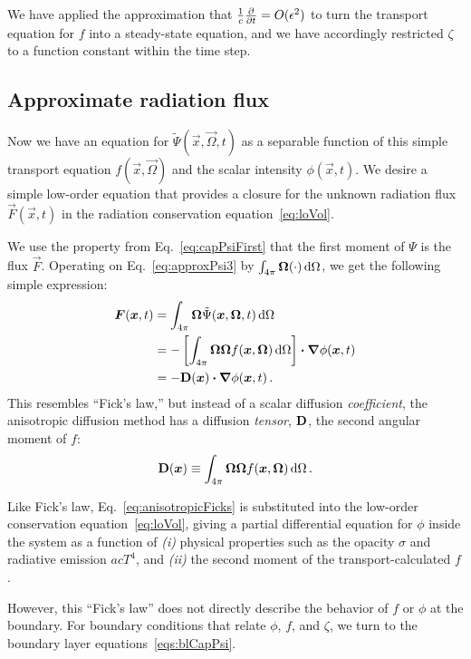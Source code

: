 We have applied the approximation that $\frac{1}{c}\frac{\partial }{\partial t}= O(\epsilon^2)$
to turn the transport equation for $f$ into a steady-state equation, and we have
accordingly restricted $\zeta$ to a function constant within the time step.

\subsection{Approximate radiation flux}
Now we have an equation for $\tilde\Psi(\vec{x}, \vec{\Omega}, t)$ as a
separable
function of this simple transport equation $f(\vec{x}, \vec{\Omega})$ and the
scalar intensity $\phi(\vec{x},t)$.
We desire a simple low-order equation that provides a closure for the unknown
radiation flux $\vec{F}(\vec{x},t)$ in the radiation conservation
equation~\eqref{eq:loVol}.

We use the property from Eq.~\eqref{eq:capPsiFirst}
that the first moment of $\Psi$ is the flux $\vec{F}$. Operating on 
Eq.~\eqref{eq:approxPsi3} by $\int_{4\pi} \bm{\Omega} (\cdot) \mathop{}\!\mathrm{d}\Omega$, we
get
the following simple expression:
\begin{align} \nonumber
  \bm{F}(\bm{x}, t)
  &= \int_{4\pi} \bm{\Omega} \tilde \Psi(\bm{x}, \bm{\Omega}, t) \mathop{}\!\mathrm{d}\Omega
  \\ \nonumber
  &= 
  - \left[ \int_{4\pi} \bm{\Omega} \bm{\Omega} f(\bm{x}, \bm{\Omega})
  \mathop{}\!\mathrm{d}\Omega \right]
  \bm{\cdot} \bm{\nabla} \phi(\bm{x},t)
  \\ \label{eq:anisotropicFicks}
  &= - \mathbf{D}(\bm{x}) \bm{\cdot} \bm{\nabla} \phi(\bm{x},t) \,.
\end{align}
This resembles ``Fick's law,'' but instead of a scalar diffusion
\emph{coefficient},
the anisotropic diffusion method has a diffusion \emph{tensor}, $\mathbf{D}$, the
second angular moment of $f$:
\begin{equation}\label{eq:dDefinition}
  \mathbf{D}(\bm{x}) \equiv \int_{4\pi} \bm{\Omega} \bm{\Omega}
  f(\bm{x}, \bm{\Omega}) \mathop{}\!\mathrm{d}\Omega \,.
\end{equation}

Like Fick's law, Eq.~\eqref{eq:anisotropicFicks} is substituted into
the low-order conservation equation~\eqref{eq:loVol}, giving a partial
differential equation for $\phi$ inside the system as a function of \textsl{(i)}
physical properties such as the opacity $\sigma$ and radiative emission $a c
T^4$, and \textsl{(ii)} the second moment of the transport-calculated $f$.

However, this ``Fick's law'' does not directly describe the behavior of $f$ or
$\phi$ at the boundary. For boundary conditions that relate $\phi$, $f$, and
$\zeta$, we turn to the boundary layer equations~\eqref{eqs:blCapPsi}.

